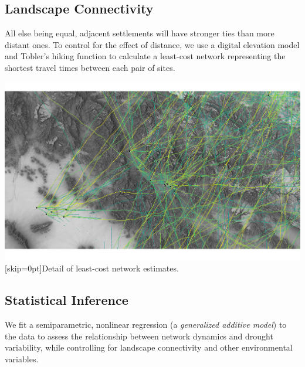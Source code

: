\documentclass[a0,final]{a0poster}
\begin{document}
\begin{multicols}{3}
\subsection*{Landscape Connectivity}
All else being equal, adjacent settlements will have stronger ties than more distant ones. To control for the effect of distance, we use a digital elevation model and Tobler's hiking function \cite{Tobler1993ThreeModeling} to calculate a least-cost network representing the shortest travel times between each pair of sites.\\
 



\begin{center}
    \includegraphics[width = .85\columnwidth]{images/fete}
        [skip=0pt]{Detail of least-cost network estimates.}

\end{center}
\vspace*{\fill}
\subsection*{Statistical Inference}
We fit a semiparametric, nonlinear regression (a \textit{generalized additive model}) to the data to assess the relationship between network dynamics and drought variability, while controlling for landscape connectivity and other environmental variables.
\vspace*{\fill}


\end{multicols}
\end{document}
